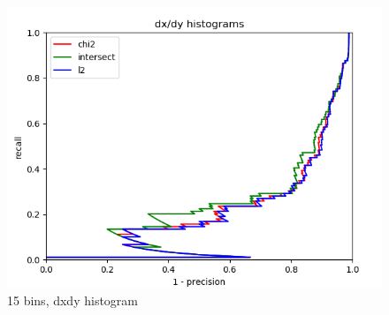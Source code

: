 \documentclass{article}
\begin{document}
\begin{figure}[ht]
\begin{minipage}{.5\textwidth}
        \includegraphics[width=\linewidth]{images/Q4.b-dxdy_histogram_15_bins.png}
        \cprotect\caption{15 bins, dxdy histogram}
    \end{minipage}
\end{figure}
\end{document}
